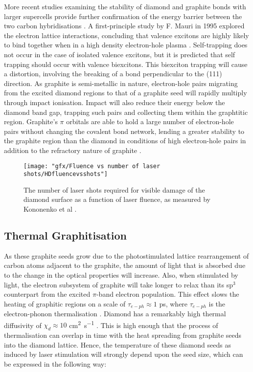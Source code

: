 More recent studies examining the stability of diamond and graphite bonds with larger supercells provide further confirmation of the energy barrier between the two carbon hybridisations \cite{popov:2019,grochala:2014}. A first-principle study by F. Mauri in 1995 explored the electron lattice interactions, concluding that valence excitons are highly likely to bind together when in a high density electron-hole plasma \cite{mauri:1995}. Self-trapping does not occur in the case of isolated valence excitons, but it is predicted that self trapping should occur with valence biexcitons. This biexciton trapping will cause a distortion, involving the breaking of a bond perpendicular to the (111) direction. As graphite is semi-metallic in nature, electron-hole pairs migrating from the excited diamond regions to that of a graphite seed will rapidly multiply through impact ionisation. Impact will also reduce their energy below the diamond band gap, trapping such pairs and collecting them within the graphtitic region. Graphite's $\pi$ orbitals are able to hold a large number of electron-hole pairs without changing the covalent bond network, lending a greater stability to the graphite region than the diamond in conditions of high electron-hole pairs in addition to the refractory nature of graphite \cite{bennington:2009}.

\begin{figure}
	\centering
	\texttt{[image: "gfx/Fluence vs number of laser shots/HDfluencevsshots"]}
	\caption{The number of laser shots required for visible damage of the diamond surface as a function of laser fluence, as measured by Kononenko et al \cite{kononenko:2008}.}
	\label{fig:fluencevsshots}
\end{figure}

\subsection{Thermal Graphitisation}
As these graphite seeds grow due to the photostimulated lattice rearrangement of carbon atoms adjacent to the graphite, the amount of light that is absorbed due to the change in the optical properties will increase. Also, when stimulated by light, the electron subsystem of graphite will take longer to relax than its sp$^{3}$ counterpart from the excited $\pi$-band electron population. This effect slows the heating of graphitic regions on a scale of $\tau_{e-ph}\approx1$ \si{\pico\second}, where $\tau_{e-ph}$ is the electron-phonon thermalisation \cite{seibert:1990}. Diamond has a remarkably high thermal diffusivity of $\chi_{d}\approx10$ \si{\centi\metre\squared\per\second} \cite{tokmakoff:1993}. This is high enough that the process of thermalisation can overlap in time with the heat spreading from graphite seeds into the diamond lattice. Hence, the temperature of these diamond seeds as induced by laser stimulation will strongly depend upon the seed size, which can be expressed in the following way:

